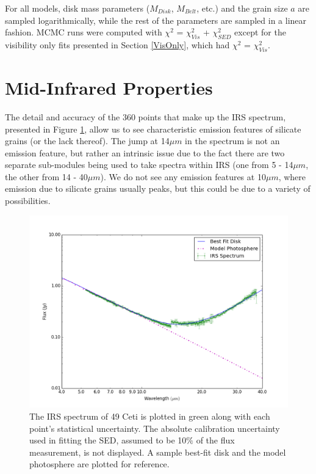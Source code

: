 {{For all models, disk mass parameters ($M_{Disk}$, $M_{Belt}$, etc.) and the grain size $a$ are sampled logarithmically, while the rest of the parameters are sampled in a linear fashion. MCMC runs were computed with $\chi^{2}$ = $\chi^{2}_{Vis}$ + $\chi^{2}_{SED}$ except for the visibility only fits presented in Section \ref{VisOnly}, which had $\chi^{2}$ = $\chi^{2}_{Vis}$. 

\section{Mid-Infrared Properties}
\label{MidIR}

The detail and accuracy of the 360 points that make up the IRS spectrum, presented in Figure \ref{fig:49CET_IRS_Window}, allow us to see characteristic emission features of silicate grains (or the lack thereof). The jump at 14$\mu m$ in the spectrum is not an emission feature, but rather an intrinsic issue due to the fact there are two separate sub-modules being used to take spectra within IRS (one from 5 - 14$\mu m$, the other from 14 - 40$\mu m$). We do not see any emission features at 10$\mu m$, where emission due to silicate grains usually peaks, but this could be due to a variety of possibilities. 
\begin{figure}[t!]
\centering
\includegraphics[width = 1\textwidth]{49CET_IRS_Window.png}
\caption{The IRS spectrum of 49 Ceti is plotted in green along with each point's statistical uncertainty. The absolute calibration uncertainty used in fitting the SED, assumed to be 10$\%$ of the flux measurement, is not displayed. A sample best-fit disk and the model photosphere are plotted for reference.}
\label{fig:49CET_IRS_Window}
\end{figure}

}}

